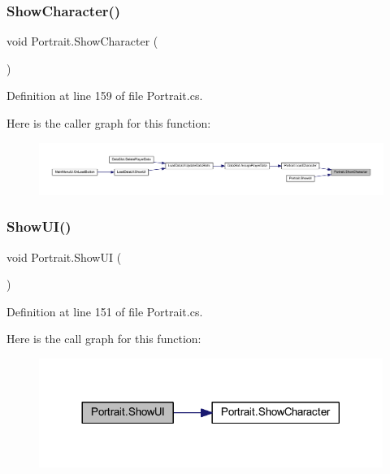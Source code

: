 \subsubsection{\texorpdfstring{ShowCharacter()}{ShowCharacter()}}
{\footnotesize\ttfamily void Portrait.\+Show\+Character (\begin{DoxyParamCaption}{ }\end{DoxyParamCaption})}



Definition at line 159 of file Portrait.\+cs.

Here is the caller graph for this function\+:
\nopagebreak
\begin{figure}[H]
\begin{center}
\leavevmode
\includegraphics[width=350pt]{class_portrait_ab8365d52d39bacdb043a5f707e9c17ef_icgraph}
\end{center}
\end{figure}
\mbox{\label{class_portrait_a5469fe5b40d6ac458f87f2748cb0805c}} 
\subsubsection{\texorpdfstring{ShowUI()}{ShowUI()}}
{\footnotesize\ttfamily void Portrait.\+Show\+UI (\begin{DoxyParamCaption}{ }\end{DoxyParamCaption})}



Definition at line 151 of file Portrait.\+cs.

Here is the call graph for this function\+:
\nopagebreak
\begin{figure}[H]
\begin{center}
\leavevmode
\includegraphics[width=317pt]{class_portrait_a5469fe5b40d6ac458f87f2748cb0805c_cgraph}
\end{center}
\end{figure}



